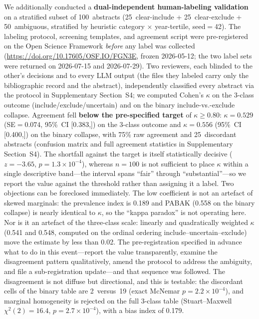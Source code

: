 \documentclass[preprint,review,12pt,authoryear]{elsarticle}
\newcommand{\ci}[2]{[#1,\;#2]}
\begin{document}
We additionally conducted a \textbf{dual-independent human-labeling validation} on a stratified subset of 100~abstracts (25~clear-include + 25~clear-exclude + 50~ambiguous, stratified by heuristic category $\times$ year-tertile, seed${=}$42).
The labeling protocol, screening templates, and agreement script were pre-registered on the Open Science Framework \emph{before} any label was collected (\url{https://doi.org/10.17605/OSF.IO/FGN3E}, frozen 2026-05-12; the two label sets were returned on 2026-07-15 and 2026-07-29).
Two reviewers, each blinded to the other's decisions and to every LLM output (the files they labeled carry only the bibliographic record and the abstract), independently classified every abstract via the protocol in Supplementary Section~S4; we computed Cohen's $\kappa$ on the 3-class outcome (include/exclude/uncertain) and on the binary include-vs.-exclude collapse.
Agreement fell \textbf{below the pre-specified target} of $\kappa{\geq}0.80$: $\kappa{=}0.529$ (SE${=}0.074$, 95\%~CI \ci{0.383}{0.674}) on the 3-class outcome and $\kappa{=}0.556$ (95\%~CI \ci{0.400}{0.712}) on the binary collapse, with 75\% raw agreement and 25~discordant abstracts (confusion matrix and full agreement statistics in Supplementary Section~S4).
The shortfall against the target is itself statistically decisive ($z{=}-3.65$, $p{=}1.3{\times}10^{-4}$), whereas $n{=}100$ is not sufficient to place $\kappa$ within a single descriptive band---the interval spans ``fair'' through ``substantial''---so we report the value against the threshold rather than assigning it a label.
Two objections can be foreclosed immediately. The low coefficient is not an artefact of skewed marginals: the prevalence index is 0.189 and PABAK (0.558 on the binary collapse) is nearly identical to $\kappa$, so the ``kappa paradox'' is not operating here. Nor is it an artefact of the three-class scale: linearly and quadratically weighted $\kappa$ (0.541 and 0.548, computed on the ordinal ordering include--uncertain--exclude) move the estimate by less than 0.02.
The pre-registration specified in advance what to do in this event---report the value transparently, examine the disagreement pattern qualitatively, amend the protocol to address the ambiguity, and file a sub-registration update---and that sequence was followed.
The disagreement is not diffuse but directional, and this is testable: the discordant cells of the binary table are 2~versus~19 (exact McNemar $p{=}2.2{\times}10^{-4}$), and marginal homogeneity is rejected on the full 3-class table (Stuart--Maxwell $\chi^2(2){=}16.4$, $p{=}2.7{\times}10^{-4}$), with a bias index of 0.179.
\end{document}
